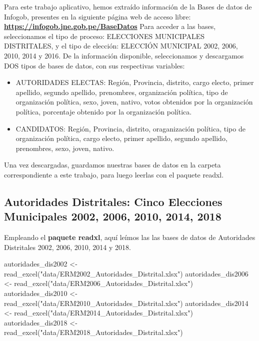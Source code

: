\documentclass[
]{book}
\newenvironment{Shaded}{\begin{snugshade}}{\end{snugshade}}
\newcommand{\FunctionTok}[1]{\textcolor[rgb]{0.00,0.00,0.00}{#1}}
\newcommand{\NormalTok}[1]{#1}
\newcommand{\OtherTok}[1]{\textcolor[rgb]{0.56,0.35,0.01}{#1}}
\newcommand{\StringTok}[1]{\textcolor[rgb]{0.31,0.60,0.02}{#1}}
\providecommand{\tightlist}{%
  \setlength{\itemsep}{0pt}\setlength{\parskip}{0pt}}
\begin{document}
Para este trabajo aplicativo, hemos extraído información de la Bases de datos de Infogob, presentes en la siguiente página web de acceso libre: \textbf{\url{https://infogob.jne.gob.pe/BaseDatos}} Para acceder a las bases, seleccionamos el tipo de proceso: ELECCIONES MUNICIPALES DISTRITALES, y el tipo de elección: ELECCIÓN MUNICIPAL 2002, 2006, 2010, 2014 y 2016. De la información disponible, seleccionamos y descargamos DOS tipos de bases de datos, con sus respectivas variables:

\begin{itemize}
\tightlist
\item
  AUTORIDADES ELECTAS: Región, Provincia, distrito, cargo electo, primer apellido, segundo apellido, prenombres, organización política, tipo de organización política, sexo, joven, nativo, votos obtenidos por la organización política, porcentaje obtenido por la organización política.
\item
  CANDIDATOS: Región, Provincia, distrito, oraganización política, tipo de organización política, cargo electo, primer apellido, segundo apellido, prenombres, sexo, joven, nativo.
\end{itemize}

Una vez descargadas, guardamos nuestras bases de datos en la carpeta correspondiente a este trabajo, para luego leerlas con el paquete readxl.

\hypertarget{autoridades-distritales-cinco-elecciones-municipales-2002-2006-2010-2014-2018}{%
\subsection{Autoridades Distritales: Cinco Elecciones Municipales 2002, 2006, 2010, 2014, 2018}\label{autoridades-distritales-cinco-elecciones-municipales-2002-2006-2010-2014-2018}}

Empleando el \textbf{paquete readxl}, aquí leímos las las bases de datos de Autoridades Distritales 2002, 2006, 2010, 2014 y 2018.

\begin{Shaded}
\begin{Highlighting}[]
\NormalTok{autoridades\_dis2002 }\OtherTok{\textless{}{-}} \FunctionTok{read\_excel}\NormalTok{(}\StringTok{"data/ERM2002\_Autoridades\_Distrital.xlsx"}\NormalTok{)}
\NormalTok{autoridades\_dis2006 }\OtherTok{\textless{}{-}} \FunctionTok{read\_excel}\NormalTok{(}\StringTok{"data/ERM2006\_Autoridades\_Distrital.xlsx"}\NormalTok{)}
\NormalTok{autoridades\_dis2010 }\OtherTok{\textless{}{-}} \FunctionTok{read\_excel}\NormalTok{(}\StringTok{"data/ERM2010\_Autoridades\_Distrital.xlsx"}\NormalTok{)}
\NormalTok{autoridades\_dis2014 }\OtherTok{\textless{}{-}} \FunctionTok{read\_excel}\NormalTok{(}\StringTok{"data/ERM2014\_Autoridades\_Distrital.xlsx"}\NormalTok{)}
\NormalTok{autoridades\_dis2018 }\OtherTok{\textless{}{-}} \FunctionTok{read\_excel}\NormalTok{(}\StringTok{"data/ERM2018\_Autoridades\_Distrital.xlsx"}\NormalTok{)}
\end{Highlighting}
\end{Shaded}
\end{document}
